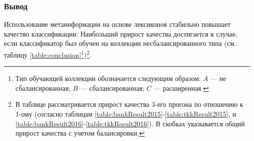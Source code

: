     \subsubsection{Вывод}
Использование метаинформации на основе лексиконов стабильно повышает качество
классификации. Наибольший прирост качества достигается в случае, если классификатор
был обучен на коллекции несбалансированного типа (см. таблицу \ref{table:conclusion}\footnote{
Тип обучающей коллекции обозначается следующим образом:
$A$ --- не сбалансированная;
$B$ --- сбалансированная;
$C$ --- расширенная.})\footnote{
В таблице рассматривается прирост качества 3-его прогона по отношению к 1-ому (согласно
таблицам \ref{table:bankResult2015}-\ref{table:tkkResult2015}, и
\ref{table:bankResult2016}-\ref{table:tkkResult2016}).
В скобках указывается общий прирост качества с учетом балансировки.
}.

